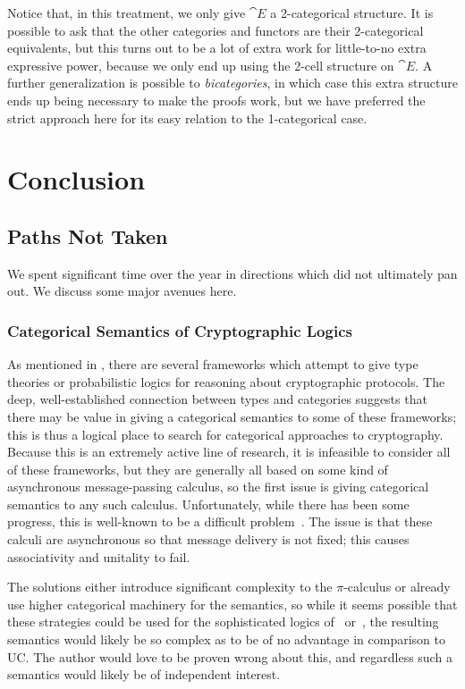 Notice that, in this treatment, we only give $\cat{E}$ a 2-categorical
structure. It is possible to ask that the other categories and functors are
their 2-categorical equivalents, but this turns out to be a lot of extra work
for little-to-no extra expressive power, because we only end up using the 2-cell
structure on $\cat{E}$. A further generalization is possible to
\emph{bicategories}, in which case this extra structure ends up being necessary
to make the proofs work, but we have preferred the strict approach here for its
easy relation to the 1-categorical case.

\section{Conclusion}
\label{sec:conclusion}
\subsection{Paths Not Taken}

We spent significant time over the year in directions which did not ultimately
pan out. We discuss some major avenues here.

\subsubsection{Categorical Semantics of Cryptographic Logics}

As mentioned in ,
there are several frameworks which attempt to give type theories or
probabilistic logics for reasoning about cryptographic protocols. The deep,
well-established connection between types and categories suggests that there may
be value in giving a categorical semantics to some of these frameworks; this is
thus a logical place to search for categorical approaches to cryptography.
Because this is an extremely active line of research, it is infeasible to
consider all of these frameworks, but they are generally all based on some kind
of asynchronous message-passing calculus, so the first issue is giving
categorical semantics to any such calculus. Unfortunately, while there has been
some progress, this is well-known to be a difficult
problem~\cite{leifer-2000,stay-2015,sakayori-2021}. The issue is that these
calculi are asynchronous so that message delivery is not fixed; this causes
associativity and unitality to fail.

The solutions either introduce significant complexity to the $\pi$-calculus or
already use higher categorical machinery for the semantics, so while it seems
possible that these strategies could be used for the sophisticated logics
of~\cite{morisett-et-al-2021} or~\cite{liao-et-al-2019}, the resulting semantics
would likely be so complex as to be of no advantage in comparison to UC. The
author would love to be proven wrong about this, and regardless such a semantics
would likely be of independent interest.

